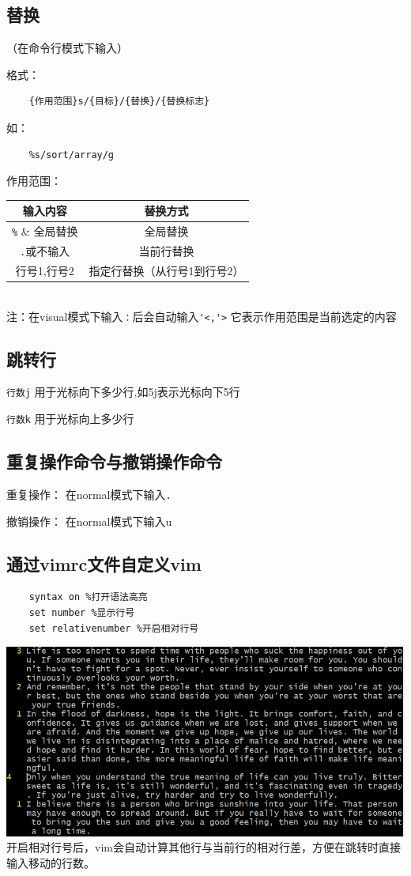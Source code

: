 \documentclass[UTF8,a4paper]{ctexart}
\begin{document}
\subsection{替换}
（在命令行模式下输入）\par
格式：
\begin{lstlisting}
    {作用范围}s/{目标}/{替换}/{替换标志}
\end{lstlisting}\par
如：
\begin{lstlisting}
    %s/sort/array/g
\end{lstlisting}\par
作用范围：
\begin{table}[H]
    \centering
    \begin{tabular}{|c|c|}
    \hline
    输入内容 & 替换方式\\
    \hline
    \verb|%| & 全局替换\\
    \hline
    \verb|.|或不输入 & 当前行替换\\
    \hline
    行号1,行号2 & 指定行替换（从行号1到行号2）\\
    \hline
\end{tabular}\\
注：在visual模式下输入\verb|：|后会自动输入\verb|'<,'>| 它表示作用范围是当前选定的内容
\end{table}

\subsection{跳转行}
\verb|行数j| 用于光标向下多少行,如5j表示光标向下5行\par
\verb|行数k| 用于光标向上多少行

\subsection{重复操作命令与撤销操作命令}
重复操作： 在normal模式下输入\verb|.|\par
撤销操作： 在normal模式下输入u

\subsection{通过vimrc文件自定义vim}
\begin{lstlisting}
    syntax on %打开语法高亮
    set number %显示行号
    set relativenumber %开启相对行号
\end{lstlisting}
\includegraphics[width=1\textwidth]{./pictures/passage.png}
开启相对行号后，vim会自动计算其他行与当前行的相对行差，方便在跳转时直接输入移动的行数。

\section{}
\end{document}
